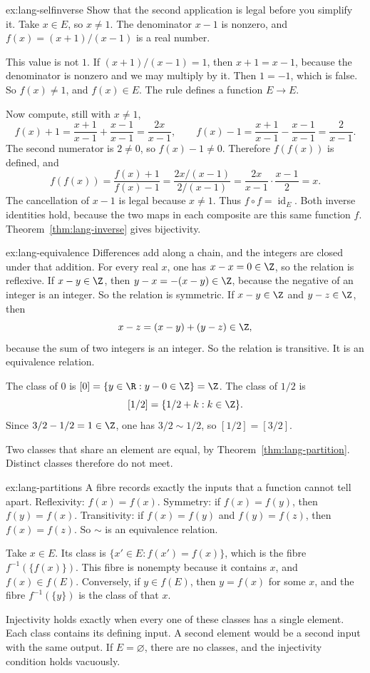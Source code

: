 \begin{solution}{ex:lang-selfinverse}
\idea Show that the second application is legal before you simplify it.
\writeup Take $x\in E$, so $x\ne 1$. The denominator $x-1$ is nonzero, and $f(x)=(x+1)/(x-1)$ is a real number.

This value is not $1$. If $(x+1)/(x-1)=1$, then $x+1=x-1$, because the denominator is nonzero and we may multiply by it. Then $1=-1$, which is false. So $f(x)\ne 1$, and $f(x)\in E$. The rule defines a function $E\to E$.

Now compute, still with $x\ne 1$,
\[
f(x)+1=\frac{x+1}{x-1}+\frac{x-1}{x-1}=\frac{2x}{x-1},
\qquad
f(x)-1=\frac{x+1}{x-1}-\frac{x-1}{x-1}=\frac{2}{x-1}.
\]
The second numerator is $2\ne 0$, so $f(x)-1\ne 0$. Therefore $f(f(x))$ is defined, and
\[
f(f(x))=\frac{f(x)+1}{f(x)-1}
=\frac{2x/(x-1)}{2/(x-1)}
=\frac{2x}{x-1}\cdot\frac{x-1}{2}
=x.
\]
The cancellation of $x-1$ is legal because $x\ne 1$. Thus $f\circ f=\operatorname{id}_E$. Both inverse identities hold, because the two maps in each composite are this same function $f$. Theorem~\ref{thm:lang-inverse} gives bijectivity.
\end{solution}

\begin{solution}{ex:lang-equivalence}
\idea Differences add along a chain, and the integers are closed under that addition.
\writeup For every real $x$, one has $x-x=0\in\Z$, so the relation is reflexive. If $x-y\in\Z$, then $y-x=-(x-y)\in\Z$, because the negative of an integer is an integer. So the relation is symmetric. If $x-y\in\Z$ and $y-z\in\Z$, then
\[
x-z=(x-y)+(y-z)\in\Z,
\]
because the sum of two integers is an integer. So the relation is transitive. It is an equivalence relation.

The class of $0$ is $[0]=\{y\in\R:y-0\in\Z\}=\Z$. The class of $1/2$ is
\[
[1/2]=\{1/2+k:k\in\Z\}.
\]
Since $3/2-1/2=1\in\Z$, one has $3/2\sim 1/2$, so $[1/2]=[3/2]$.

Two classes that share an element are equal, by Theorem~\ref{thm:lang-partition}. Distinct classes therefore do not meet.
\end{solution}

\begin{solution}{ex:lang-partitions}
\idea A fibre records exactly the inputs that a function cannot tell apart.
\writeup Reflexivity: $f(x)=f(x)$. Symmetry: if $f(x)=f(y)$, then $f(y)=f(x)$. Transitivity: if $f(x)=f(y)$ and $f(y)=f(z)$, then $f(x)=f(z)$. So $\sim$ is an equivalence relation.

Take $x\in E$. Its class is $\{x'\in E:f(x')=f(x)\}$, which is the fibre $f^{-1}(\{f(x)\})$. This fibre is nonempty because it contains $x$, and $f(x)\in f(E)$. Conversely, if $y\in f(E)$, then $y=f(x)$ for some $x$, and the fibre $f^{-1}(\{y\})$ is the class of that $x$.

Injectivity holds exactly when every one of these classes has a single element. Each class contains its defining input. A second element would be a second input with the same output. If $E=\varnothing$, there are no classes, and the injectivity condition holds vacuously.
\end{solution}

